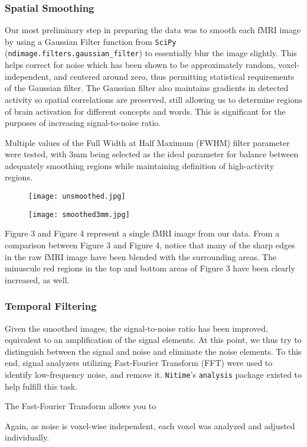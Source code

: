\subsubsection{Spatial Smoothing}
\par Our most preliminary step in preparing the data was to smooth each fMRI image by using a Gaussian Filter function from \texttt{SciPy}  (\texttt{ndimage.filters.gaussian\_filter}) to essentially blur the image slightly. This helps correct for noise which has been shown to be approximately random, voxel-independent, and centered around zero, thus permitting statistical requirements of the Gaussian filter. The Gaussian filter also maintains gradients in detected activity so spatial correlations are preserved, still allowing us to determine regions of brain activation for different concepts and words. This is significant for the purposes of increasing signal-to-noise ratio.
\par Multiple values of the Full Width at Half Maximum (FWHM) filter parameter were tested, with 3mm being selected as the ideal parameter for balance between adequately smoothing regions while maintaining definition of high-activity regions.

\begin{figure}[H]
\centering
\begin{minipage}{.5\textwidth}
  \centering
  \texttt{[image: unsmoothed.jpg]}
  \label{fig:test1}
\end{minipage}%
\begin{minipage}{.5\textwidth}
  \centering
  \texttt{[image: smoothed3mm.jpg]}
  \label{fig:test2}
\end{minipage}
\end{figure}

\par Figure 3 and Figure 4 represent a single fMRI image from our data. From a comparison between Figure 3 and Figure 4, notice that many of the sharp edges in the raw fMRI image have been blended with the surrounding areas. The minuscule red regions in the top and bottom areas of Figure 3 have been clearly increased, as well.  

\subsubsection{Temporal Filtering}
\par Given the smoothed images, the signal-to-noise ratio has been improved, equivalent to an amplification of the signal elements. At this point, we thus try to distinguish between the signal and noise and eliminate the noise elements. To this end, signal analyzers utilizing Fast-Fourier Transform (FFT) were used to identify low-frequency noise, and remove it. \texttt{Nitime}'s \texttt{analysis} package existed to help fulfill this task. 
\par The Fast-Fourier Transform	allows you to  
\par Again, as noise is voxel-wise independent, each voxel was analyzed and adjusted individually.

